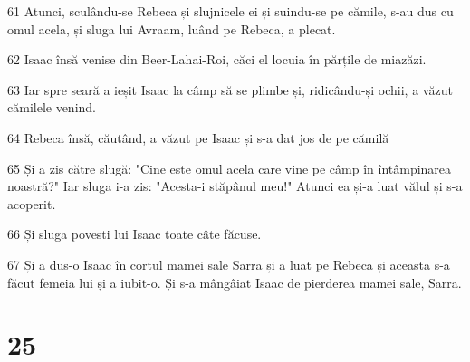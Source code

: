 \par 61 Atunci, sculându-se Rebeca și slujnicele ei și suindu-se pe cămile, s-au dus cu omul acela, și sluga lui Avraam, luând pe Rebeca, a plecat.
\par 62 Isaac însă venise din Beer-Lahai-Roi, căci el locuia în părțile de miazăzi.
\par 63 Iar spre seară a ieșit Isaac la câmp să se plimbe și, ridicându-și ochii, a văzut cămilele venind.
\par 64 Rebeca însă, căutând, a văzut pe Isaac și s-a dat jos de pe cămilă
\par 65 Și a zis către slugă: "Cine este omul acela care vine pe câmp în întâmpinarea noastră?" Iar sluga i-a zis: "Acesta-i stăpânul meu!" Atunci ea și-a luat vălul și s-a acoperit.
\par 66 Și sluga povesti lui Isaac toate câte făcuse.
\par 67 Și a dus-o Isaac în cortul mamei sale Sarra și a luat pe Rebeca și aceasta s-a făcut femeia lui și a iubit-o. Și s-a mângâiat Isaac de pierderea mamei sale, Sarra.

\chapter{25}

